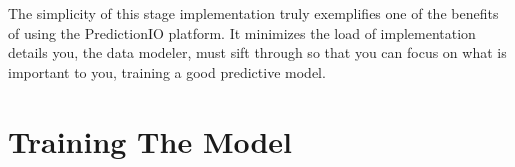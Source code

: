 \documentclass[a4paper,12pt]{article}
\newcommand{\3}{\left}
\newcommand{\4}{\right}
\renewcommand{\-}[1]{{}^{-#1}}
\begin{document}
The simplicity of this stage implementation truly exemplifies one of the benefits of using the PredictionIO platform. It minimizes the load of implementation details you, the data modeler, must sift through so that you can focus on what is important to you, training a good predictive model.

\section*{Training The Model}
\end{document}
